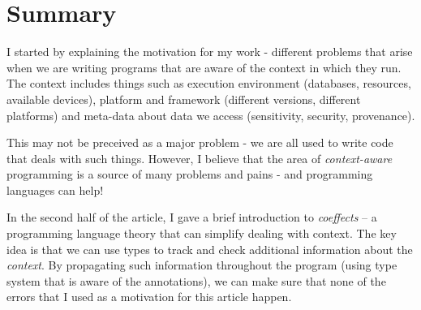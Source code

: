 
\section{Summary}

I started by explaining the
motivation for my work - different problems that arise when we are writing programs that are
aware of the context in which they run. The context includes things such as execution environment
(databases, resources, available devices), platform and framework (different versions, different
platforms) and meta-data about data we access (sensitivity, security, provenance). 

This may not be preceived as a major problem - we are all used to write code that deals with
such things. However, I believe that the area of \emph{context-aware} programming is a source of
many problems and pains - and programming languages can help!

In the second half of the article, I gave a brief introduction to \emph{coeffects} -- a programming
language theory that can simplify dealing with context.
The key idea is that we can use types to track and check additional information about
the \emph{context}. By propagating such information throughout the program (using type system
that is aware of the annotations), we can make sure that none of the errors that I used
as a motivation for this article happen. 
